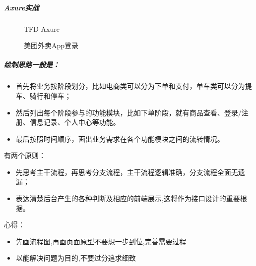 \documentclass[letterpaper,11pt,english]{sphinxmanual}
\begin{document}
\subparagraph{Axure实战}
\label{\detokenize{chapter_knowledge/flow_chart:axure}}
\begin{figure}[H]
\centering
\capstart

\noindent{}
\caption{TFD
Axure\sphinxfootnotemark[509]}\label{\detokenize{chapter_knowledge/flow_chart:id36}}\end{figure}
%
\begin{footnotetext}[509]\sphinxAtStartFootnote
{}
%
\end{footnotetext}\ignorespaces 
\begin{figure}[H]
\centering
\capstart

\noindent{}
\caption{美团外卖App登录}\label{\detokenize{chapter_knowledge/flow_chart:id37}}\end{figure}


\subparagraph{绘制思路一般是：}
\label{\detokenize{chapter_knowledge/flow_chart:id9}}\begin{itemize}
\item {} 
首先将业务按阶段划分，比如电商类可以分为下单和支付，单车类可以分为提车、骑行和停车；

\item {} 
然后列出每个阶段参与的功能模块，比如下单阶段，就有商品查看、登录/注册、信息记录、个人中心等功能。

\item {} 
最后按照时间顺序，画出业务需求在各个功能模块之间的流转情况。

\end{itemize}

有两个原则：
\begin{itemize}
\item {} 
先思考主干流程，再思考分支流程，主干流程逻辑准确，分支流程全面无遗漏；

\item {} 
表达清楚后台产生的各种判断及相应的前端展示,这将作为接口设计的重要根据。

\end{itemize}

心得：
\begin{itemize}
\item {} 
先画流程图,再画页面原型不要想一步到位,完善需要过程

\item {} 
以能解决问题为目的,不要过分追求细致

\end{itemize}
\end{document}

